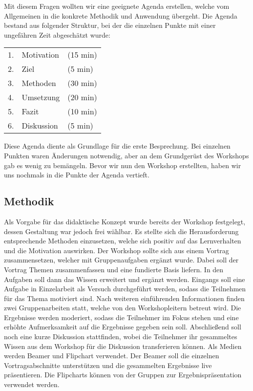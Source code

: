 Mit diesem Fragen wollten wir eine geeignete Agenda erstellen, welche vom Allgemeinen in die konkrete Methodik und Anwendung übergeht. Die Agenda bestand aus folgender Struktur, bei der die einzelnen Punkte mit einer ungefähren Zeit abgeschätzt wurde:

\begin{center}
	
\begin{tabular}{r l  l}
	1.&Motivation	&(15 min) \\
	2.&Ziel		&	(5 min) \\
	3.&Methoden	&	(30 min) \\
	4.&Umsetzung	&	(20 min) \\ 
	5.&Fazit		&	(10 min) \\
	6.&Diskussion	&(5 min) \\
\end{tabular}

\end{center}

Diese Agenda diente als Grundlage für die erste Besprechung. Bei einzelnen Punkten waren Änderungen notwendig, aber an dem Grundgerüst des Workshops gab es wenig zu bemängeln. Bevor wir nun den Workshop erstellten, haben wir uns nochmals in die Punkte der Agenda vertieft. 


\subsection{Methodik}  

Als Vorgabe für das didaktische Konzept wurde bereits der Workshop festgelegt, dessen Gestaltung war jedoch frei wählbar. Es stellte sich die Herausforderung entsprechende Methoden einzusetzen, welche sich positiv auf das Lernverhalten und die Motivation auswirken. Der Workshop sollte sich aus einem Vortrag zusammensetzen, welcher mit Gruppenaufgaben ergänzt wurde. Dabei soll der Vortrag Themen zusammenfassen und eine fundierte Basis liefern. In den Aufgaben soll dann das Wissen erweitert und ergänzt werden. Eingangs soll eine  Aufgabe in Einzelarbeit als Versuch durchgeführt werden, sodass die Teilnehmen für das Thema motiviert sind. Nach weiteren einführenden Informationen finden zwei Gruppenarbeiten statt, welche von den Workshopleitern betreut wird. Die Ergebnisse werden moderiert, sodass die Teilnehmer im Fokus stehen und eine erhöhte Aufmerksamkeit auf die Ergebnisse gegeben sein soll. Abschließend soll noch eine kurze Diskussion stattfinden, wobei die Teilnehmer ihr gesammeltes Wissen aus dem Workshop für die Diskussion transferieren können. Als Medien werden Beamer und Flipchart verwendet. Der Beamer soll die einzelnen Vortragsabschnitte unterstützen und die gesammelten Ergebnisse live präsentieren. Die Flipcharts können von der Gruppen zur Ergebnispräsentation verwendet werden. 



